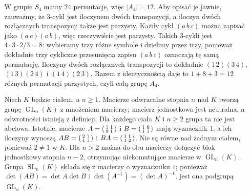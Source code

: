 \begin{przyklad}
\label{aa:prz:a4-opis}
W grupie $S_4$ mamy $24$ permutacje, więc
$|A_4|=12$. Aby opisać je jawnie, zauważmy, że
$3$-cykl jest iloczynem dwóch transpozycji, a iloczyn
dwóch rozłącznych transpozycji także jest parzysty.
Każdy cykl $(a\,b\,c)$ można zapisać jako
$(a\,c)(a\,b)$, więc rzeczywiście jest parzysty.
Takich $3$-cykli jest $4\cdot3\cdot2/3=8$:
wybieramy trzy różne symbole i dzielimy przez trzy,
ponieważ dokładnie trzy cykliczne przesunięcia zapisu
$(a\,b\,c)$ oznaczają tę samą permutację.
Iloczyny dwóch rozłącznych transpozycji to dokładnie
$(1\,2)(3\,4)$, $(1\,3)(2\,4)$ i $(1\,4)(2\,3)$.
Razem z identycznością daje to $1+8+3=12$ różnych
permutacji parzystych, czyli całą grupę $A_4$.
\end{przyklad}

\begin{przyklad}
Niech $K$ będzie ciałem, a $n\ge1$.
Macierze odwracalne stopnia $n$ nad $K$ tworzą grupę
$\operatorname{GL}_n(K)$ z mnożeniem macierzy;
macierz jednostkowa jest neutralna, a odwrotności istnieją
z definicji. Dla każdego ciała $K$ i $n\ge2$ grupa ta nie jest abelowa.
Istotnie, macierze
$A=\begin{psmallmatrix}1&1\\0&1\end{psmallmatrix}$
i $B=\begin{psmallmatrix}1&0\\1&1\end{psmallmatrix}$ mają wyznacznik $1$,
a ich iloczyny wynoszą
$AB=\begin{psmallmatrix}2&1\\1&1\end{psmallmatrix}$
i $BA=\begin{psmallmatrix}1&1\\1&2\end{psmallmatrix}$.
Nie są równe nad żadnym ciałem, ponieważ $2\ne1$ w $K$.
Dla $n>2$ można do obu macierzy dołączyć blok jednostkowy
stopnia $n-2$, otrzymując niekomutujące macierze w $\operatorname{GL}_n(K)$.
Grupa $\operatorname{SL}_n(K)$
składa się z macierzy o wyznaczniku $1$;
ponieważ $\det(AB)=\det A\det B$ i
$\det(A^{-1})=(\det A)^{-1}$, jest ona podgrupą $\operatorname{GL}_n(K)$.
\end{przyklad}

